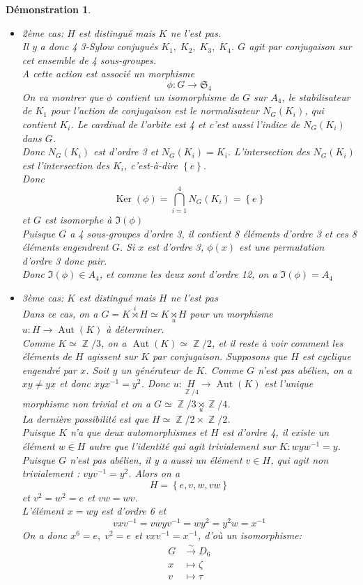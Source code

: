 \documentclass[a4paper, oneside]{report}
\theoremstyle{break}
\newtheorem*{demonstration}{Démonstration}
\newcommand{\fong}{\overset{\sim}{\rightarrow}}
\DeclareMathOperator{\Z}{\mathbb{Z}}
\DeclarePairedDelimiter\ens{\left\{ }{\right\} }%
\DeclareMathOperator{\Ker}{Ker}
\DeclareMathOperator{\Aut}{Aut}
\renewcommand{\ens}[1]{\left\{ #1 \right\} }%
\newcommand{\us}{\underset}
\newcommand{\os}{\overset}
\begin{document}
\begin{demonstration}
\begin{itemize}
\item 2ème cas: $H$ est distingué mais $K$ ne l'est pas.\\
Il y a donc 4 3-Sylow conjugués $K_1, \; K_2, \; K_3, \; K_4$. $G$ agit par conjugaison sur cet ensemble de 4 sous-groupes.\\
A cette action est associé un morphisme
\[
\phi : G \longrightarrow \mathfrak{S}_4
\]
On va montrer que $\phi$ contient un isomorphisme de $G$ sur $A_4$, le stabilisateur de $K_1$ pour l'action de conjugaison est le normalisateur $N_G(K_i)$, qui contient $K_i$. Le cardinal de l'orbite est 4 et c'est aussi l'indice de $N_G(K_i)$ dans $G$.\\
Donc $N_G(K_i)$ est d'ordre 3 et $N_G(K_i) = K_i$. L'intersection des $N_G(K_i)$ est l'intersection des $K_i$, c'est-à-dire $\ens{e}$.\\
Donc 
\[
\Ker(\phi) = \bigcap_{i = 1}^4 N_G(K_i) = \ens{e}
\]
et $G$ est isomorphe à $\Im(\phi)$\\
Puisque $G$ a 4 sous-groupes d'ordre 3, il contient 8 éléments d'ordre 3 et ces 8 éléments engendrent $G$. Si $x$ est d'ordre 3, $\phi(x)$ est une permutation d'ordre 3 donc pair.\\
Donc $\Im(\phi) \in A_4$, et comme les deux sont d'ordre 12, on a $\Im(\phi) = A_4$

\item 3ème cas: $K$ est distingué mais $H$ ne l'est pas\\
Dans ce cas, on a $G = K \os{i}{\rtimes} H \simeq K \us{u}{\rtimes} H$ pour un morphisme $u : H \longrightarrow \Aut(K)$ à déterminer.\\
Comme $K \simeq \Z/3$, on a $\Aut(K) \simeq \Z/2$, et il reste à voir comment les éléments de $H$ agissent sur $K$ par conjugaison. Supposons que $H$ est cyclique engendré par $x$. Soit $y$ un générateur de $K$. Comme $G$ n'est pas abélien, on a $xy \neq yx$ et donc $xyx^{-1} = y^2$. Donc $u : \us{\Z/4}{H} \longrightarrow \Aut(K)$ est l'unique morphisme non trivial et on a $G \simeq \Z/3 \us{u}{\rtimes} \Z/4$.\\
La dernière possibilité est que $H \simeq \Z/2 \times \Z/2$.\\
Puisque $K$ n'a que deux automorphismes et $H$ est d'ordre 4, il existe un élément $w \in H$ autre que l'identité qui agit trivialement sur $K : wyw^{-1} = y$.\\
Puisque $G$ n'est pas abélien, il y a aussi un élément $v \in H$, qui agit non trivialement : $vyv^{-
1} = y^2$. Alors on a 
\[
H = \ens{e, v, w, vw}
\]
et $v^2 = w^2 = e$ et $vw = wv$.\\
L'élément $x = wy$ est d'ordre 6 et
\[
vxv^{-1} = vwyv^{-1} = wy^2 = y^2w = x^{-1}
\]
On a donc $x^6 = e, \; v^2 = e$ et $vxv^{-1} = x^{-1}$, d'où un isomorphisme:
\begin{align*}
G &\fong D_6
\\
x &\mapsto \zeta
\\
v &\mapsto \tau
\end{align*}
\end{itemize}
~
\end{demonstration}
\end{document}
